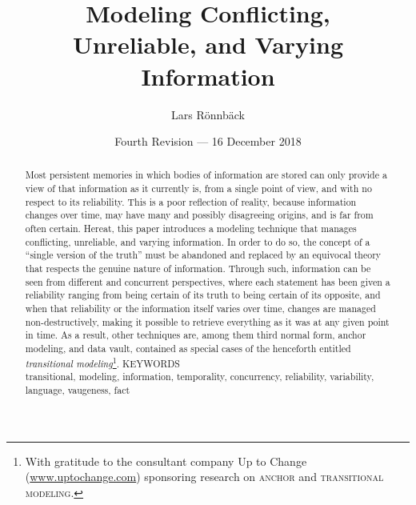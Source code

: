\documentclass[sfsidenotes,nobib,twoside,symmetric]{tufte-handout}
\title{Modeling Conflicting,\protect\\ Unreliable, and Varying\protect\\ Information}
\author[Lars R\"onnb\"ack \;--\; DOI: 10.13140/RG.2.2.34381.49121/1]{Lars R\"onnb\"ack}
\date{\footnotesize Fourth Revision --- 16 December 2018} %
\begin{document}
\maketitle%

\begin{abstract}
\noindent 
Most persistent memories in which bodies of information are stored can only provide a view of that information as it currently is, from a single point of view, and with no respect to its reliability. This is a poor reflection of reality, because information changes over time, may have many and possibly disagreeing origins, and is far from often certain. Hereat, this paper introduces a modeling technique that manages conflicting, unreliable, and varying information. In order to do so, the concept of a \enquote{single version of the truth} must be abandoned and replaced by an equivocal theory that respects the genuine nature of information. Through such, information can be seen from different and concurrent perspectives, where each statement has been given a reliability ranging from being certain of its truth to being certain of its opposite, and when that reliability or the information itself varies over time, changes are managed non-destructively, making it possible to retrieve everything as it was at any given point in time. As a result, other techniques are, among them third normal form, 
anchor modeling, 
and data vault, contained as special cases of the henceforth entitled \emph{transitional modeling}\thanks{With gratitude to the consultant company Up to Change (\url{www.uptochange.com}) sponsoring research on \textsc{anchor} and \textsc{transitional modeling}.}.
\vskip12pt
\noindent\textsc{\footnotesize KEYWORDS}\\
\noindent transitional, modeling, information, temporality, concurrency, reliability, variability, language, vaugeness, fact
\end{abstract}
\end{document}
